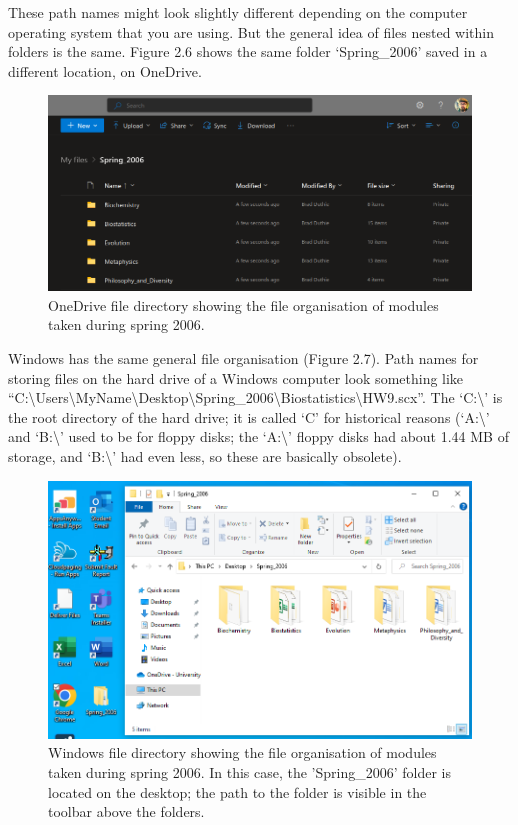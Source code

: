 \documentclass[
]{scrbook}
\begin{document}
These path names might look slightly different depending on the computer operating system that you are using.
But the general idea of files nested within folders is the same.
Figure 2.6 shows the same folder `Spring\_2006' saved in a different location, on OneDrive.

\begin{figure}
\includegraphics[width=1\linewidth]{img/OneDrive} \caption{OneDrive file directory showing the file organisation of modules taken during spring 2006.}\label{fig:unnamed-chunk-9}
\end{figure}

Windows has the same general file organisation (Figure 2.7).
Path names for storing files on the hard drive of a Windows computer look something like ``C:\textbackslash Users\textbackslash MyName\textbackslash Desktop\textbackslash Spring\_2006\textbackslash Biostatistics\textbackslash HW9.scx''.
The `C:\textbackslash{}' is the root directory of the hard drive; it is called `C' for historical reasons (`A:\textbackslash{}' and `B:\textbackslash{}' used to be for floppy disks; the `A:\textbackslash{}' floppy disks had about 1.44 MB of storage, and `B:\textbackslash{}' had even less, so these are basically obsolete).

\begin{figure}
\includegraphics[width=1\linewidth]{img/directory_windows} \caption{Windows file directory showing the file organisation of modules taken during spring 2006. In this case, the 'Spring\_2006' folder is located on the desktop; the path to the folder is visible in the toolbar above the folders.}\label{fig:unnamed-chunk-10}
\end{figure}
\end{document}

